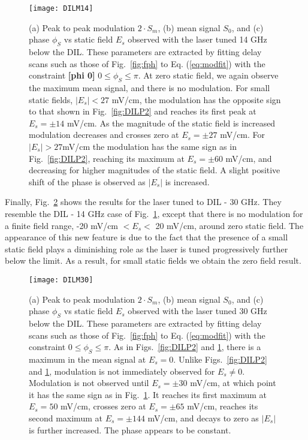 \documentclass[aps,pra,reprint,groupedaddress]{revtex4-1}
\begin{document}
\begin{figure}
	\texttt{[image: DILM14]}
	\caption{(a) Peak to peak modulation $2 \cdot S_m$, (b) mean signal $S_0$, and (c) phase $\phi_S$ vs static field $E_s$ observed with the laser tuned 14 GHz below the DIL. These parameters are extracted by fitting delay scans such as those of Fig.~\ref{fig:fph} to Eq. (\ref{eq:modfit}) with the constraint \textbf{[phi 0]} $0 \leq \phi_S \leq \pi$. At zero static field, we again observe the maximum mean signal, and there is no modulation. For small static fields, $|E_s|<27$ mV/cm, the modulation has the opposite sign to that shown in Fig.~\ref{fig:DILP2} and reaches its first peak at $E_s = \pm 14$ mV/cm. As the magnitude of the static field is increased modulation decreases and crosses zero at $E_s = \pm 27$ mV/cm. For $|E_s|> 27$mV/cm the modulation has the same sign as in Fig.~\ref{fig:DILP2}, reaching its maximum at $E_s= \pm 60$ mV/cm, and decreasing for higher magnitudes of the static field. A slight positive shift of the phase is observed as $|E_s|$ is increased.}
	\label{fig:DILM14}
\end{figure}

Finally, Fig.~\ref{fig:DILM30} shows the results for the laser tuned to DIL - 30 GHz. They resemble the DIL - 14 GHz case of Fig.~\ref{fig:DILM14}, except that there is no modulation for a finite field range, -20 mV/cm $<E_s<$ 20 mV/cm, around zero static field. The appearance of this new feature is due to the fact that the presence of a small static field plays a diminishing role as the laser is tuned progressively further below the limit. As a result, for small static fields we obtain the zero field result.

\begin{figure}
	\texttt{[image: DILM30]}
	\caption{(a) Peak to peak modulation $2 \cdot S_m$, (b) mean signal $S_0$, and (c) phase $\phi_S$ vs static field $E_s$ observed with the laser tuned 30 GHz below the DIL. These parameters are extracted by fitting delay scans such as those of Fig.~\ref{fig:fph} to Eq. (\ref{eq:modfit}) with the constraint $0 \leq \phi_S \leq \pi$. As in Figs.~\ref{fig:DILP2} and \ref{fig:DILM14}, there is a maximum in the mean signal at $E_s=0$. Unlike Figs.~\ref{fig:DILP2} and \ref{fig:DILM14}, modulation is not immediately observed for $E_s\neq 0$. Modulation is not observed until $E_s=\pm 30$ mV/cm, at which point it has the same sign as in Fig.~\ref{fig:DILM14}. It reaches its first maximum at $E_s = 50$ mV/cm, crosses zero at $E_s=\pm 65$ mV/cm, reaches its second maximum at $E_s = \pm 144$ mV/cm, and decays to zero as $|E_s|$ is further increased. The phase appears to be constant.}
	\label{fig:DILM30}
\end{figure}
\end{document}
